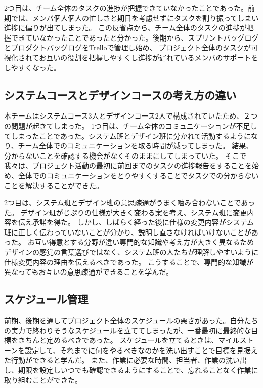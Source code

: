 2つ目は、チーム全体のタスクの進捗が把握できていなかったことであった。前期では、メンバ個人個人の忙しさと期日を考慮せずにタスクを割り振ってしまい進捗に偏りが出てしまった。
この反省点から、チーム全体のタスクの進捗が把握できていなかったことであったと分かった。後期から、スプリントバッグログとプロダクトバッグログをTrelloで管理し始め、
プロジェクト全体のタスクが可視化されてお互いの役割を把握しやすくし進捗が遅れているメンバのサポートをしやすくなった。

\subsection{システムコースとデザインコースの考え方の違い}
本チームはシステムコース3人とデザインコース2人で構成されていたため、２つの問題が起きてしまった。
1つ目は、チーム全体のコミュニケーションが不足してしまったことであった。システム班とデザイン班に分かれて活動するようになり、チーム全体でのコミュニケーションを取る時間が減ってしまった。
結果、分からないことを確認する機会がなくそのままにしてしまっていた。
そこで我々は、プロジェクト活動の最初に前回までのタスクの進捗報告をすることを始め、全体でのコミュニケーションをとりやすくすることでタスクでの分からないことを解決することができた。

2つ目は、システム班とデザイン班の意思疎通がうまく噛み合わないことであった。
デザイン班がじぷりの仕様が大きく変わる案を考え、システム班に変更内容を伝え承諾を得た。
しかし、しばらく経った後に仕様の変更内容がシステム班に正しく伝わっていないことが分かり、説明し直さなければいけないことがあった。
お互い得意とする分野が違い専門的な知識や考え方が大きく異なるためデザインの感覚の言葉選びではなく、システム班の人たちが理解しやすいように仕様変更内容の理由を伝えるべきであった。
こうすることで、専門的な知識が異なってもお互いの意思疎通ができることを学んだ。

\subsection{スケジュール管理}
前期、後期を通してプロジェクト全体のスケジュールの悪さがあった。自分たちの実力で終わりそうなスケジュールを立ててしまったが、一番最初に最終的な目標をきちんと定めるべきであった。
スケジュールを立てるときは、マイルストーンを設定して、それまでに何をやるべきなのかを洗い出すことで目標を見据えた行動ができると学んだ。
また、作業に必要な時間、担当者、作業の洗い出し、期限を設定しいつでも確認できるようにすることで、忘れることなく作業に取り組むことができた。
